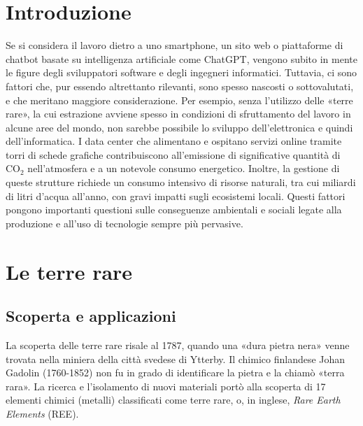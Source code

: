 \documentclass[12pt,a4paper,oneside]{book}
\begin{document}
\restoregeometry




\topmargin=-2cm
\setcounter{page}{1}
\textheight=25cm %
\tableofcontents

\raggedbottom

\setcounter{chapter}{-1}
\pagestyle{plain}
\chapter{Introduzione}

Se si considera il lavoro dietro a uno smartphone, un sito web o piattaforme di chatbot basate su intelligenza artificiale come ChatGPT, vengono subito in mente le figure degli sviluppatori software e degli ingegneri informatici. Tuttavia, ci sono fattori che, pur essendo altrettanto rilevanti, sono spesso nascosti o sottovalutati, e che meritano maggiore considerazione.
Per esempio, senza l'utilizzo delle «terre rare», la cui estrazione avviene spesso in condizioni di sfruttamento del lavoro in alcune aree del mondo, non sarebbe possibile lo sviluppo dell'elettronica e quindi dell'informatica. I data center che alimentano e ospitano servizi online tramite torri di schede grafiche contribuiscono all'emissione di significative quantità di CO$_2$ nell'atmosfera e a un notevole consumo energetico. Inoltre, la gestione di queste strutture richiede un consumo intensivo di risorse naturali, tra cui miliardi di litri d'acqua all'anno, con gravi impatti sugli ecosistemi locali. Questi fattori pongono importanti questioni sulle conseguenze ambientali e sociali legate alla produzione e all'uso di tecnologie sempre più pervasive.

\chapter{Le terre rare}

\section{Scoperta e applicazioni}

La scoperta delle terre rare risale al 1787, quando una «dura pietra nera» venne trovata nella miniera della città svedese di Ytterby. Il chimico finlandese Johan Gadolin (1760-1852) non fu in grado di identificare la pietra e la chiamò «terra rara». La ricerca e l'isolamento di nuovi materiali portò alla scoperta di 17 elementi chimici (metalli) classificati come terre rare, o, in inglese, \textit{Rare Earth Elements} (REE).
\end{document}
